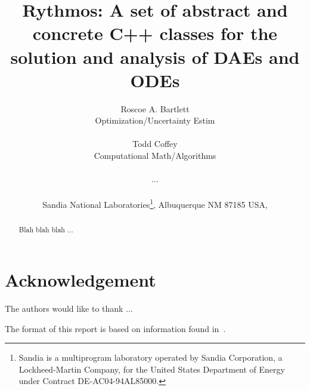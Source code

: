 \documentclass[pdf,ps2pdf,11pt]{SANDreport}
\title{
Rythmos: A set of abstract and concrete C++ classes for the solution and
analysis of DAEs and ODEs
}
\author{
Roscoe A. Bartlett \\ Optimization/Uncertainty Estim \\ \\
Todd Coffey \\ Computational Math/Algorithms \\ \\
... \\ \\
Sandia National Laboratories\footnote{
Sandia is a multiprogram laboratory operated by Sandia Corporation, a
Lockheed-Martin Company, for the United States Department of Energy
under Contract DE-AC04-94AL85000.}, Albuquerque NM 87185 USA, \\
}
\date{}
\begin{document}
\raggedright

\maketitle

%

%
\begin{abstract}
%
Blah blah blah ...
%
\end{abstract}
%

%
\clearpage
\section*{Acknowledgement}
The authors would like to thank ...

The format of this report is based on information found
in~\cite{Sand98-0730}.

%
\clearpage
\tableofcontents
\listoffigures


\end{document}
